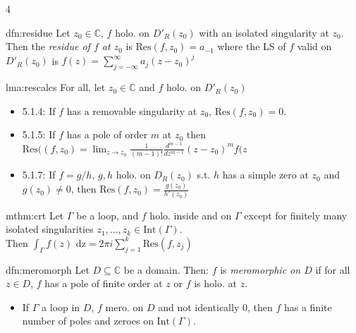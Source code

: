 \documentclass[landscape, 8pt]{extarticle}
\begin{document}
\begin{multicols*}{4}
		
		\begin{dfn}{dfn:residue}{ }
			Let $z_0 \in \mathbb{C}$, $f$ holo. on $D'_R(z_0)$ with an isolated singularity at $z_0$. Then the \textit{residue of $f$ at $z_0$} is $\text{Res}(f, z_0) = a_{-1}$ where the LS of $f$ valid on $D'_R(z_0)$ is $f(z) = \sum_{j= -\infty}^{\infty}a_j(z-z_0)^j$
			
			
		\end{dfn}
		
		\begin{lma}{lma:rescalcs}{ }
			For all, let $z_0 \in \mathbb{C}$ and $f$ holo. on $D'_R(z_0)$
			\begin{itemize}
				\item 5.1.4: If $f$ has a removable singularity at $z_0$, $\text{Res}(f, z_0) = 0$.
				\item 5.1.5: If $f$ has a pole of order $m$ at $z_0$ then $\text{Res}((f, z_0) = \lim_{z\to z_0}\frac{1}{(m-1)!}\frac{d^{m-1}}{dz^{m-1}}(z-z_0)^m f(z$
				\item 5.1.7: If $f= g/h$, $g, h$ holo. on $D_R(z_0)$ s.t. $h$ has a simple zero at $z_0$ and $g(z_0) \ne 0$, then $\text{Res}(f, z_0) = \frac{g(z_0)}{h'(z_0)}$
			\end{itemize}
			
			
		\end{lma}
		
		
		\begin{mthm}{mthm:crt}{ }
			Let $\Gamma$ be a loop, and $f$ holo. inside and on $\Gamma$ except for finitely many isolated singularities $z_1, ..., z_k \in \text{Int}(\Gamma)$. \\
			Then $\int_{\Gamma}f(z) \text{ dz} = 2 \pi i \sum_{j = 1}^{k} \text{Res}(f, z_j)$
			
			
		\end{mthm}
		
		
		\begin{dfn}[Meromorphicity]{dfn:meromorph}{ }
			Let $D \subseteq \mathbb{C}$ be a domain. Then: $f$ is \textit{meromorphic on $D$} if for all $z\in D$, $f$ has a pole of finite order at $z$ or $f$ is holo. at $z$.
			
			\begin{itemize}
				\item If $\Gamma$ a loop in $D$, $f$ mero. on $D$ and not identically $0$, then $f$ has a finite number of poles and zeroes on $\text{Int}(\Gamma)$.
			\end{itemize}
			

\end{dfn}
\end{multicols*}
\end{document}
